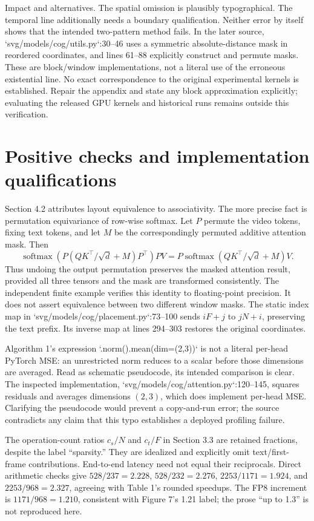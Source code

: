 \documentclass[10pt]{article}
\begin{document}
Impact and alternatives. The spatial omission is plausibly typographical. The temporal line additionally needs a boundary qualification. Neither error by itself shows that the intended two-pattern method fails. In the later source, `svg/models/cog/utils.py`:30–46 uses a symmetric absolute-distance mask in reordered coordinates, and lines 61–88 explicitly construct and permute masks. These are block/window implementations, not a literal use of the erroneous existential line. No exact correspondence to the original experimental kernels is established. Repair the appendix and state any block approximation explicitly; evaluating the released GPU kernels and historical runs remains outside this verification.\par
\section*{Positive checks and implementation qualifications}
Section 4.2 attributes layout equivalence to associativity. The more precise fact is permutation equivariance of row-wise softmax. Let \(P\) permute the video tokens, fixing text tokens, and let \(M\) be the correspondingly permuted additive attention mask. Then \[\operatorname{softmax}\!\left(P(QK^\top/\sqrt d+M)P^\top\right)PV
=P\operatorname{softmax}(QK^\top/\sqrt d+M)V.\] Thus undoing the output permutation preserves the masked attention result, provided all three tensors and the mask are transformed consistently. The independent finite example verifies this identity to floating-point precision. It does not assert equivalence between two different window masks. The static index map in `svg/models/cog/placement.py`:73–100 sends \(iF+j\) to \(jN+i\), preserving the text prefix. Its inverse map at lines 294–303 restores the original coordinates.\par
Algorithm 1’s expression `.norm().mean(dim=(2,3))` is not a literal per-head PyTorch MSE: an unrestricted norm reduces to a scalar before those dimensions are averaged. Read as schematic pseudocode, its intended comparison is clear. The inspected implementation, `svg/models/cog/attention.py`:120–145, squares residuals and averages dimensions \((2,3)\), which does implement per-head MSE. Clarifying the pseudocode would prevent a copy-and-run error; the source contradicts any claim that this typo establishes a deployed profiling failure.\par
The operation-count ratios \(c_s/N\) and \(c_t/F\) in Section 3.3 are retained fractions, despite the label “sparsity.” They are idealized and explicitly omit text/first-frame contributions. End-to-end latency need not equal their reciprocals. Direct arithmetic checks give \(528/237=2.228\), \(528/232=2.276\), \(2253/1171=1.924\), and \(2253/968=2.327\), agreeing with Table 1’s rounded speedups. The FP8 increment is \(1171/968=1.210\), consistent with Figure 7’s 1.21 label; the prose “up to 1.3” is not reproduced here.\par
\end{document}

